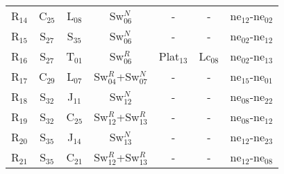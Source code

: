 \begin{table}[H]
{{\begin{tabular}{ c c c c c c c }
                    R$_{14}$  & C$_{25}$ & L$_{08}$ & Sw$_{06}^{N}$ & - & - & ne$_{12}$-ne$_{02}$\\
                    R$_{15}$  & S$_{27}$ & S$_{35}$ & Sw$_{06}^{N}$ & - & - & ne$_{02}$-ne$_{12}$\\
                    R$_{16}$  & S$_{27}$ & T$_{01}$ & Sw$_{06}^{R}$ & Plat$_{13}$ & Lc$_{08}$ & ne$_{02}$-ne$_{13}$\\
                    R$_{17}$  & C$_{29}$ & L$_{07}$ & Sw$_{04}^{R}$+Sw$_{07}^{N}$ & - & - & ne$_{15}$-ne$_{01}$\\
                    R$_{18}$  & S$_{32}$ & J$_{11}$ & Sw$_{12}^{N}$ & - & - & ne$_{08}$-ne$_{22}$\\
                    R$_{19}$  & S$_{32}$ & C$_{25}$ & Sw$_{12}^{R}$+Sw$_{13}^{R}$ & - & - & ne$_{08}$-ne$_{12}$\\
                    R$_{20}$  & S$_{35}$ & J$_{14}$ & Sw$_{13}^{N}$ & - & - & ne$_{12}$-ne$_{23}$\\
                    R$_{21}$  & S$_{35}$ & C$_{21}$ & Sw$_{12}^{R}$+Sw$_{13}^{R}$ & - & - & ne$_{12}$-ne$_{08}$\\
                \hline
            \end{tabular}
        }
     }
    \end{table}
    
    \lipsum[1]